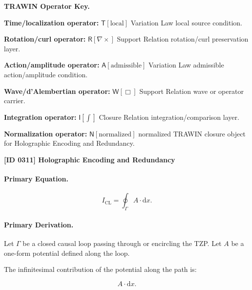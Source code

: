 \par\vspace{0.45\baselineskip}
\noindent\begin{minipage}[t]{\linewidth}
\begingroup
\small
\raggedright
\textbf{TRAWIN Operator Key.}\par
\noindent\textbf{Time/localization operator:} $\mathsf{T}\!\left[\mathrm{local}\right]$ Variation Law local source condition.\par
\noindent\textbf{Rotation/curl operator:} $\mathsf{R}\!\left[\nabla\times\right]$ Support Relation rotation/curl preservation layer.\par
\noindent\textbf{Action/amplitude operator:} $\mathsf{A}\!\left[\mathrm{admissible}\right]$ Variation Law admissible action/amplitude condition.\par
\noindent\textbf{Wave/d'Alembertian operator:} $\mathsf{W}\!\left[\Box\right]$ Support Relation wave or operator carrier.\par
\noindent\textbf{Integration operator:} $\mathsf{I}\!\left[\int\right]$ Closure Relation integration/comparison layer.\par
\noindent\textbf{Normalization operator:} $\mathsf{N}\!\left[\mathrm{normalized}\right]$ normalized TRAWIN closure object for Holographic Encoding and Redundancy.\par
\endgroup
\end{minipage}

\clearpage
\noindent\textbf{[ID 0311] Holographic Encoding and Redundancy}\par
\vspace{0.35em}
\paragraph{Primary Equation.}
\begin{equation}
I_{\mathrm{CL}}
=
\oint_{\Gamma} A\cdot \mathrm{d}x .
\end{equation}

\paragraph{Primary Derivation.}
Let $\Gamma$ be a closed causal loop passing through or encircling the TZP.  
Let $A$ be a one-form potential defined along the loop.

The infinitesimal contribution of the potential along the path is:

\begin{equation}
A\cdot \mathrm{d}x .
\end{equation}

